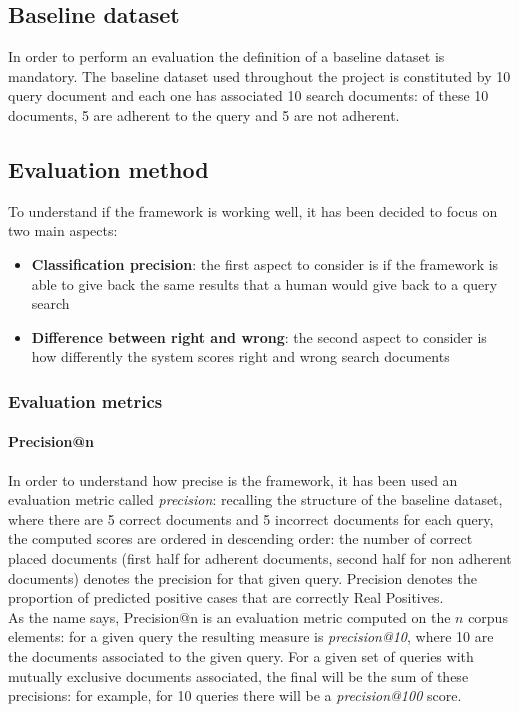 \documentclass[\main/main.tex]{subfiles}
\begin{document}
\subsection{Baseline dataset}
In order to perform an evaluation the definition of a baseline dataset is mandatory. The baseline dataset used throughout the project is constituted by 10 query document and each one has associated 10 search documents: of these 10 documents, 5 are adherent to the query and 5 are not adherent.
\subsection{Evaluation method}
To understand if the framework is working well, it has been decided to focus on two main aspects:
\begin{itemize}
    \item \textbf{Classification precision}: the first aspect to consider is if the framework is able to give back the same results that a human would give back to a query search
    \item \textbf{Difference between right and wrong}: the second aspect to consider is how differently the system scores right and wrong search documents
\end{itemize}
\subsubsection{Evaluation metrics}
\paragraph{Precision@n} In order to understand how precise is the framework, it has been used an evaluation metric called \textit{precision}: recalling the structure of the baseline dataset, where there are 5 correct documents and 5 incorrect documents for each query, the computed scores are ordered in descending order: the number of correct placed documents (first half for adherent documents, second half for non adherent documents) denotes the precision for that given query. Precision denotes the proportion of predicted positive cases that are correctly Real Positives. \cite{DBLP:journals/corr/abs-2010-16061}\\
As the name says, Precision@n is an evaluation metric computed on the $n$ corpus elements: for a given query the resulting measure is \textit{precision@10}, where 10 are the documents associated to the given query. For a given set of queries with mutually exclusive documents associated, the final will be the sum of these precisions: for example, for 10 queries there will be a \textit{precision@100} score.
\end{document}
